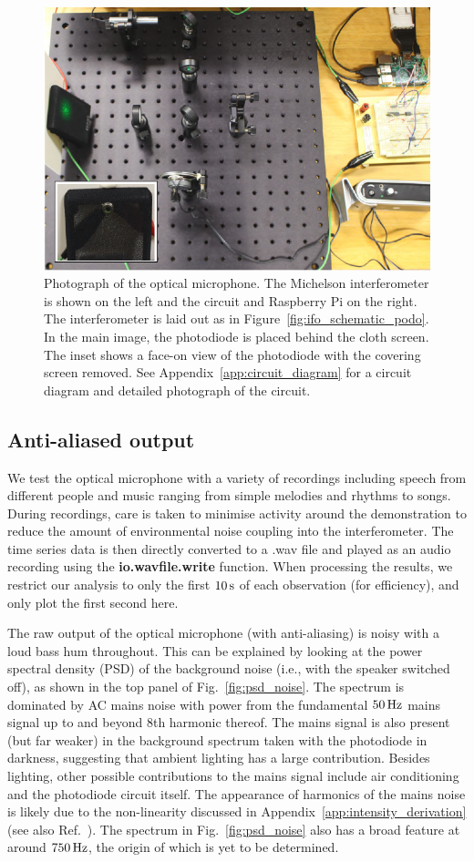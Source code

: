 \documentclass[paper-main.tex]{subfiles}
\begin{document}
\begin{figure}
	\includegraphics[width=.49\textwidth]{figures/setup_pic2.pdf}
\caption{Photograph of the optical microphone. The Michelson interferometer is shown on the left and the circuit and Raspberry Pi on the right. The interferometer is laid out as in Figure~\ref{fig:ifo_schematic_podo}. In the main image, the photodiode is placed behind the cloth screen. The inset shows a face-on view of the photodiode with the covering screen removed. See Appendix~\ref{app:circuit_diagram} for a circuit diagram and detailed photograph of the circuit.}
	\label{fig:setup_pic2}
\end{figure}


\subsection{Anti-aliased output}
\label{sec:initialResultsOpMic}

We test the optical microphone with a variety of recordings including speech from different people and music ranging from simple melodies and rhythms to songs. During recordings, care is taken to minimise activity around the demonstration to reduce the amount of environmental noise coupling into the interferometer. The time series data is then directly converted to a .wav file and played as an audio recording using the \textbf{io.wavfile.write} function. When processing the results, we restrict our analysis to only the first $10\,{\rm s}$ of each observation (for efficiency), and only plot the first second here. 

The raw output of the optical microphone (with anti-aliasing) is noisy with a loud bass hum throughout. This can be explained by looking at the power spectral density (PSD) of the background noise (i.e., with the speaker switched off), as shown in the top panel of Fig.~\ref{fig:psd_noise}. The spectrum is dominated by AC mains noise with power from the fundamental $50\,{\rm Hz}$ mains signal up to and beyond $8$th harmonic thereof. The mains signal is also present (but far weaker) in the background spectrum taken with the photodiode in darkness, suggesting that ambient lighting has a large contribution. Besides lighting, other possible contributions to the mains signal include air conditioning and the photodiode circuit itself. The appearance of harmonics of the mains noise is likely due to the non-linearity discussed in Appendix~\ref{app:intensity_derivation} (see also Ref.~\cite{feynman}). The spectrum in Fig.~\ref{fig:psd_noise} also has a broad feature at around $750\,{\rm Hz}$, the origin of which is yet to be determined.
\end{document}
